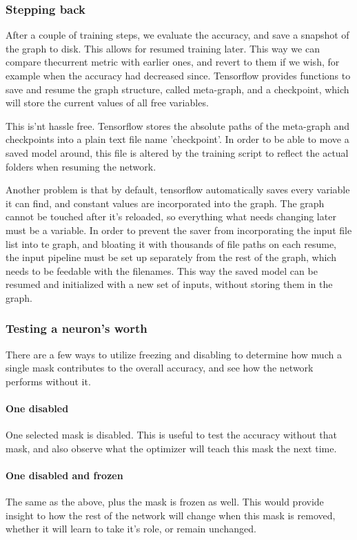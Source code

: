 \documentclass[a4paper,12pt]{article}
\begin{document}
\subsubsection{Stepping back}
After a couple of training steps, we evaluate the accuracy, and save a snapshot of the graph to disk. This allows for resumed training later. This way we can compare thecurrent metric with earlier ones, and revert to them if we wish, for example when the accuracy had decreased since. Tensorflow provides functions to save and resume the graph structure, called meta-graph, and a checkpoint, which will store the current values of all free variables.\par
This is'nt hassle free. Tensorflow stores the absolute paths of the meta-graph and checkpoints into a plain text file name 'checkpoint'. In order to be able to move a saved model around, this file is altered by the training script to reflect the actual folders when resuming the network.\par
Another problem is that by default, tensorflow automatically saves every variable it can find, and constant values are incorporated into the graph. The graph cannot be touched after it's reloaded, so everything what needs changing later must be a variable. In order to prevent the saver from incorporating the input file list into te graph, and bloating it with thousands of file paths on each resume, the input pipeline must be set up separately from the rest of the graph, which needs to be feedable with the filenames. This way the saved model can be resumed and initialized with a new set of inputs, without storing them in the graph.
\subsubsection{Testing a neuron's worth}
There are a few ways to utilize freezing and disabling to determine how much a single mask contributes to the overall accuracy, and see how the network performs without it.
\paragraph{One disabled}One selected mask is disabled. This is useful to test the accuracy without that mask, and also observe what the optimizer will teach this mask the next time.
\paragraph{One disabled and frozen}The same as the above, plus the mask is frozen as well. This would provide insight to how the rest of the network will change when this mask is removed, whether it will learn to take it's role, or remain unchanged.
\end{document}
